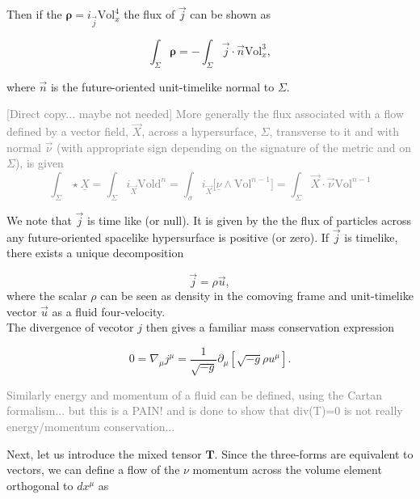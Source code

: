 \documentclass[11pt,a4paper,headinclude=true,DIV=14,BCOR=8mm,chapterprefix,listof=totoc,twoside,openright,abstracton]{scrbook}
\begin{document}
Then if the $\boldsymbol{\rho} = i_{\vec{j}}\text{Vol}_x ^4$ the flux of $\vec{j}$ can be shown as 

\begin{equation}
\int_{\Sigma} \boldsymbol{\rho} = - \int_{\Sigma}\vec{j}\cdot\vec{n}\text{Vol}_x ^3,
\end{equation}

where $\vec{n}$ is the future-oriented unit-timelike normal to $\Sigma$.


\textcolor{gray}{
[Direct copy... maybe not needed] More generally the flux associated with a flow defined by a vector field, $\vec{X}$, across a hypersurface, $\Sigma$, transverse to it and with normal $\vec{\nu}$ (with appropriate sign depending on the signature of the metric and on $\Sigma$), is given 
\begin{equation}
\int_{\Sigma} \star\underline{X} = \int_{\Sigma}i_{\vec{X}}\text{Vold}^n = \int_{\sigma}i_{\vec{X}}\big[\underline{\nu}\wedge\text{Vol}^{n-1}\big] = \int_{\Sigma}\vec{X}\cdot\vec{\nu}\text{Vol}^{n-1}
\end{equation}
}

We note that $\vec{j}$ is time like (or null). It is given by the the flux of particles across any future-oriented spacelike hypersurface is positive (or zero). If $\vec{j}$ is timelike, there exists a unique decomposition 

\begin{equation}
\vec{j} = \rho \vec{u},
\label{eq:theory:defofjandu}
\end{equation}
where the scalar $\rho$ can be seen as density in the comoving frame and unit-timelike vector $\vec{u}$ as a fluid four-velocity.\\

The divergence of vecotor $j$ then gives a familiar mass conservation expression

\begin{equation}
0 = \nabla_{\mu}j^{\mu} = \frac{1}{\sqrt{-g}}\partial_{\mu}[\sqrt{-g}\rho u^{\mu}].
\label{eq:theory:nablamu_jmu}
\end{equation}

\textcolor{gray}{Similarly energy and momentum of a fluid can be defined, using the Cartan formalism... but this is a PAIN! and is done to show that div(T)=0 is not really energy/momentum conservation...}

Next, let us introduce the mixed tensor $\boldsymbol{T}$. Since the three-forms are equivalent to vectors, we can define a flow of the $\nu$ momentum across the volume element orthogonal to $dx^{\mu}$ as 
\end{document}
